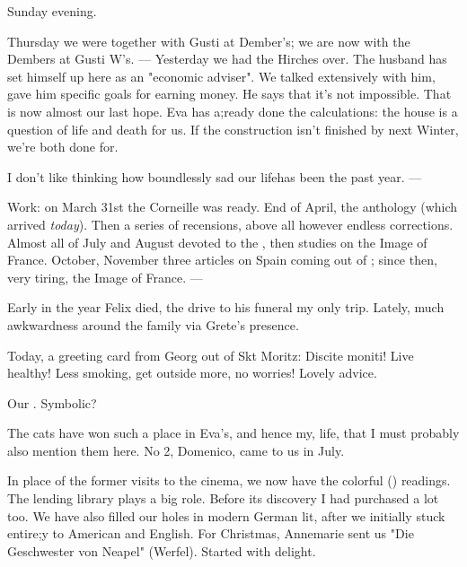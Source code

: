 Sunday evening.

Thursday we were together with Gusti at Dember's; we are now with the Dembers at Gusti W's. — Yesterday we had the Hirches over. The husband has set himself up here as an "economic adviser". We talked extensively with him, gave him specific goals for earning money. He says that it's not impossible. That is now almost our last hope. Eva has a;ready done the calculations: the house is a question of life and death for us. If the construction isn't finished by next Winter, we're both done for. 

I don't like thinking how boundlessly sad our lifehas been the past year. —

Work: on March 31st the Corneille was ready. End of April, the anthology (which arrived \textit{today}). Then a series of recensions, above all however endless corrections.  Almost all of July and August devoted to the , then studies on the Image of France. October, November three articles on Spain coming out of ; since then, very tiring, the Image of France. —

Early in the year Felix died, the drive to his funeral my only trip. Lately, much awkwardness around the family via Grete's presence. 

Today, a greeting card from Georg out of Skt Moritz: Discite moniti! Live healthy! Less smoking, get outside more, no worries! Lovely advice.

Our . Symbolic?

The cats have won such a place in Eva's, and hence my, life, that I must probably also mention them here. No 2, Domenico, came to us in July.

In place of the former visits to the cinema, we now have the colorful () readings. The lending library plays a big role. Before its discovery I had purchased a lot too. We have also filled our holes in modern German lit, after we initially stuck entire;y to American and English. For Christmas, Annemarie sent us "Die Geschwester von Neapel" (Werfel). Started with delight.